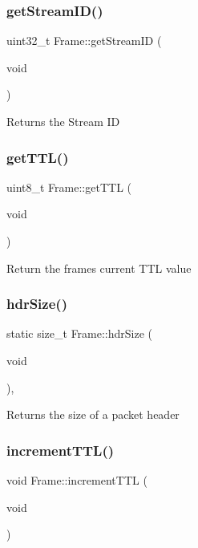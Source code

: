 \subsubsection{\texorpdfstring{get\+Stream\+I\+D()}{getStreamID()}}
{\footnotesize\ttfamily uint32\+\_\+t Frame\+::get\+Stream\+ID (\begin{DoxyParamCaption}\item[{void}]{ }\end{DoxyParamCaption})\hspace{0.3cm}{\ttfamily [inline]}}

Returns the Stream ID \mbox{\label{classFrame_a383e2fb65096f4c57f37b48d3d74f07d}} 
\subsubsection{\texorpdfstring{get\+T\+T\+L()}{getTTL()}}
{\footnotesize\ttfamily uint8\+\_\+t Frame\+::get\+T\+TL (\begin{DoxyParamCaption}\item[{void}]{ }\end{DoxyParamCaption})\hspace{0.3cm}{\ttfamily [inline]}}

Return the frame\textquotesingle{}s current T\+TL value \mbox{\label{classFrame_a1807a7893ff81064f2e92cb5ab065ec8}} 
\subsubsection{\texorpdfstring{hdr\+Size()}{hdrSize()}}
{\footnotesize\ttfamily static size\+\_\+t Frame\+::hdr\+Size (\begin{DoxyParamCaption}\item[{void}]{ }\end{DoxyParamCaption})\hspace{0.3cm}{\ttfamily [inline]}, {\ttfamily [static]}}

Returns the size of a packet header \mbox{\label{classFrame_a46139e40aaadc65459f1d094e6f7fc20}} 
\subsubsection{\texorpdfstring{increment\+T\+T\+L()}{incrementTTL()}}
{\footnotesize\ttfamily void Frame\+::increment\+T\+TL (\begin{DoxyParamCaption}\item[{void}]{ }\end{DoxyParamCaption})\hspace{0.3cm}{\ttfamily [inline]}}

